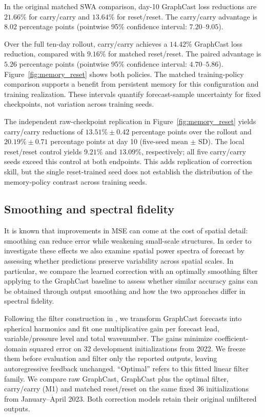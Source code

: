 \documentclass{article}
\newcommand{\vfourchange}[1]{{\color{blue}#1}}
\newcommand{\vfourred}[1]{{\color{red}#1}}
\begin{document}
\vfourchange{In the original matched SWA comparison, day-10 GraphCast loss reductions are $21.66\%$ for carry/carry and $13.64\%$ for reset/reset. The carry/carry advantage is $8.02$ percentage points (pointwise 95\% confidence interval: $7.20$--$9.05$).}

\vfourchange{Over the full ten-day rollout, carry/carry achieves a $14.42\%$ GraphCast loss reduction, compared with $9.16\%$ for matched reset/reset. The paired advantage is $5.26$ percentage points (pointwise 95\% confidence interval: $4.70$--$5.86$). Figure~\ref{fig:memory_reset} shows both policies. The matched training-policy comparison supports a benefit from persistent memory for this configuration and training realization. These intervals quantify forecast-sample uncertainty for fixed checkpoints, not variation across training seeds.}

\vfourchange{The independent raw-checkpoint replication in Figure~\ref{fig:memory_reset} yields carry/carry reductions of $13.51\%\pm0.42$ percentage points over the rollout and $20.19\%\pm0.71$ percentage points at day 10 (five-seed mean $\pm$ SD). The local reset/reset control yields $9.21\%$ and $13.09\%$, respectively; all five carry/carry seeds exceed this control at both endpoints. This adds replication of correction skill, but the single reset-trained seed does not establish the distribution of the memory-policy contrast across training seeds.}

\FloatBarrier
\subsection{\vfourred{Smoothing and spectral fidelity}}
\label{sec:smoothing}
\vfourred{It is known \citep{lam2023graphcast,subich2025spectral} that improvements in MSE can come at the cost of spatial detail: smoothing can reduce error while weakening small-scale structures. In order to investigate these effects we also examine spatial power spectra of forecast by assessing whether predictions preserve variability across spatial scales.  In particular, we compare the learned correction with an optimally smoothing filter applying to the GraphCast baseline to assess whether similar accuracy gains can be obtained through output smoothing and how the two approaches differ in spectral fidelity.}

\vfourred{Following the filter construction in \citet[Supplementary Section~7.4.2]{lam2023graphcast}, we transform GraphCast forecasts into spherical harmonics and fit one multiplicative gain per forecast lead, variable/pressure level and total wavenumber. The gains minimize coefficient-domain squared error on 32 development initializations from 2022. We freeze them before evaluation and filter only the reported outputs, leaving autoregressive feedback unchanged. ``Optimal'' refers to this fitted linear filter family. We compare raw GraphCast, GraphCast plus the optimal filter, carry/carry (M1) and matched reset/reset on the same fixed 36 initializations from January--April 2023. Both correction models retain their original unfiltered outputs.}
\end{document}
